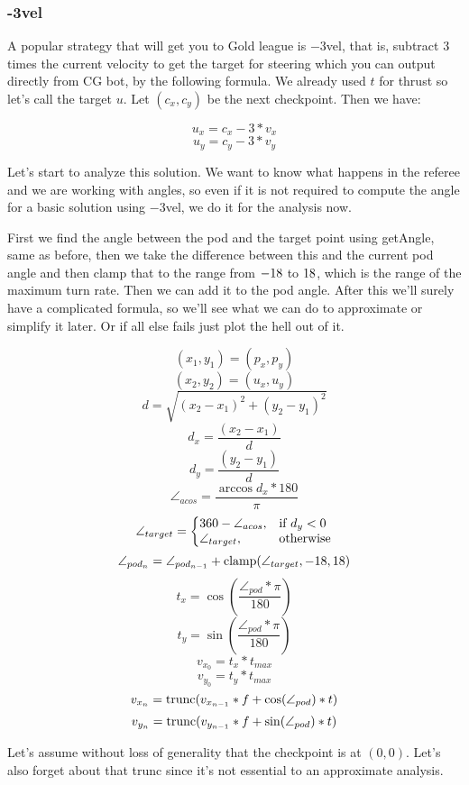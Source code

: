 \documentclass[main.tex]{subfiles}
\begin{document}
\subsubsection{-3vel}
A popular strategy that will get you to Gold league is $-3$vel, that is, subtract 3 times the current
velocity to get the target for steering which you can output directly from CG bot, by the following formula.
We already used $t$ for thrust so let's call the target $u$. Let $(c_x, c_y)$ be the next checkpoint.
Then we have:

$$ u_x = c_x - 3 * v_x $$
$$ u_y = c_y - 3 * v_y $$

Let's start to analyze this solution. We want to know what happens in the referee and we are working with angles,
so even if it is not required to compute the angle for a basic solution using $-3$vel, we do it for the analysis now.

First we find the angle between the pod and the target point using getAngle, same as before, then we take the difference
between this and the current pod angle and then clamp that to the range from $-18$ to $18$, which is the
range of the maximum turn rate. Then we can add it to the pod angle. After this we'll surely have a complicated
formula, so we'll see what we can do to approximate or simplify it later. Or if all else fails just plot the hell out
of it.

$$ (x_1, y_1) = (p_x, p_y) $$
$$ (x_2, y_2) = (u_x, u_y) $$
$$ d = \sqrt{(x_2 - x_1)^2 + (y_2 - y_1)^2} $$
$$ d_x = \frac{(x_2 - x_1)}{d} $$
$$ d_y = \frac{(y_2 - y_1)}{d} $$
$$ \angle_{acos} = \frac{\arccos{d_x} * 180}{\pi} $$
$$
  \angle_{target}=\left\{
  \begin{array}{@{}ll@{}}
    360 - \angle_{acos}, & \text{if}\ d_y < 0 \\
    \angle_{target}, & \text{otherwise}
  \end{array}\right.
$$
$$\angle_{pod_n} = \angle_{pod_{n-1}} + \operatorname{clamp}(\angle_{target}, -18, 18)$$
$$ t_x = \cos(\frac{\angle_{pod}*\pi}{180}) $$
$$ t_y = \sin(\frac{\angle_{pod}*\pi}{180}) $$
$$ v_{x_0} = t_x * t_{max} $$
$$ v_{y_0} = t_y * t_{max} $$
$$ v_{x_n} = \operatorname{trunc}(v_{x_{n-1}} * f + \cos(\angle_{pod}) * t) $$
$$ v_{y_n} = \operatorname{trunc}(v_{y_{n-1}} * f + \sin(\angle_{pod}) * t) $$

Let's assume without loss of generality that the checkpoint is at $(0, 0)$.
Let's also forget about that trunc since it's not essential to an approximate analysis.
\end{document}
